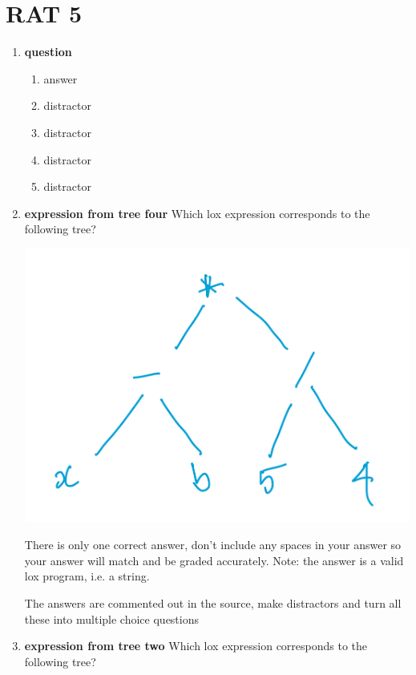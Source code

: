 \documentclass[twoside=false, DIV=14]{scrartcl}
\begin{document}
\newpage
\part*{RAT 5}
\renewcommand{\labelenumii}{\alph{enumii}) $\square$}
\begin{enumerate}
\item \textbf{question}
\begin{enumerate}
  \item answer \tick
  \item distractor
  \item distractor
  \item distractor
  \item distractor
\end{enumerate}
  \item \textbf{expression from tree four}
  Which lox expression corresponds to the following tree?
  
  \includegraphics[width=\textwidth]{expr_tree_four.jpeg}
  
  There is only one correct answer, don't include any spaces in your answer so your answer will match and be graded accurately.  Note: the answer is a valid lox program, i.e. a string.%
  \begin{todo}
  The answers are commented out in the source, make distractors and turn all these into multiple choice questions
  \end{todo}

  \item \textbf{expression from tree two}
  Which lox expression corresponds to the following tree? 
  

\end{enumerate}
\end{document}
